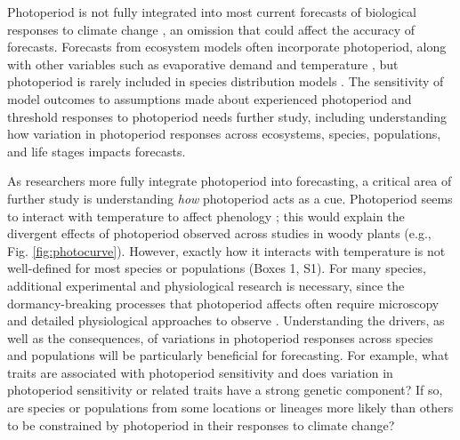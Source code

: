 \documentclass{article}
\begin{document}
\par Photoperiod is not fully integrated into most current forecasts of biological responses to climate change \citep[but see][]{tobin2008}, an omission that could affect the accuracy of forecasts. Forecasts from ecosystem models often incorporate photoperiod, along with other variables such as evaporative demand and temperature \citep [e.g., the Ecosystem Demography model] []{jolly2005,medvigy2013}, but photoperiod is rarely included in species distribution models \citep [e.g.,] []{morin2009,zhu2012}. The sensitivity of model outcomes to assumptions made about experienced photoperiod and threshold responses to photoperiod needs further study, including understanding how variation in photoperiod responses across ecosystems, species, populations, and life stages impacts forecasts. %

\par As researchers more fully integrate photoperiod into forecasting, a critical area of further study is understanding \emph{how} photoperiod acts as a cue. Photoperiod seems to interact with temperature to affect phenology \citep[e.g., ][]{zydlewski2014}; this would explain the divergent effects of photoperiod observed across studies in woody plants (e.g., Fig. \ref{fig:photocurve}). However, exactly how it interacts with temperature is not well-defined for most species or populations (Boxes 1, S1). For many species, additional experimental and physiological research is necessary, since the dormancy-breaking processes that photoperiod affects often require microscopy and detailed physiological approaches to observe \citep{hanninen2019, chuine2016}.  Understanding the drivers, as well as the consequences, of variations in photoperiod responses across species and populations will be particularly beneficial for forecasting. For example, what traits are associated with photoperiod sensitivity and does variation in photoperiod sensitivity or related traits have a strong genetic component? If so, are species or populations from some locations or lineages more likely than others to be constrained by photoperiod in their responses to climate change?
\end{document}
